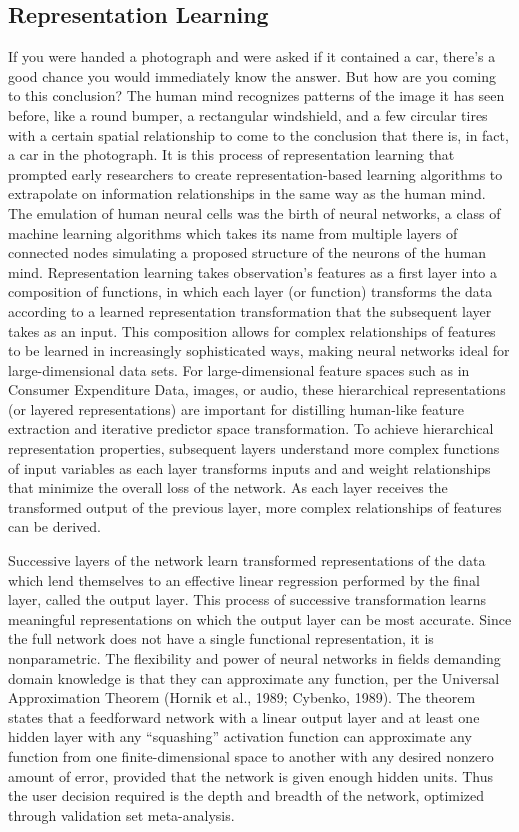 \documentclass[12pt,twoside]{reedthesis}
\begin{document}
\subsection{Representation Learning}\label{representation-learning}

If you were handed a photograph and were asked if it contained a car,
there's a good chance you would immediately know the answer. But how are
you coming to this conclusion? The human mind recognizes patterns of the
image it has seen before, like a round bumper, a rectangular windshield,
and a few circular tires with a certain spatial relationship to come to
the conclusion that there is, in fact, a car in the photograph. It is
this process of representation learning that prompted early researchers
to create representation-based learning algorithms to extrapolate on
information relationships in the same way as the human mind. The
emulation of human neural cells was the birth of neural networks, a
class of machine learning algorithms which takes its name from multiple
layers of connected nodes simulating a proposed structure of the neurons
of the human mind. Representation learning takes observation's features
as a first layer into a composition of functions, in which each layer
(or function) transforms the data according to a learned representation
transformation that the subsequent layer takes as an input. This
composition allows for complex relationships of features to be learned
in increasingly sophisticated ways, making neural networks ideal for
large-dimensional data sets. For large-dimensional feature spaces such
as in Consumer Expenditure Data, images, or audio, these hierarchical
representations (or layered representations) are important for
distilling human-like feature extraction and iterative predictor space
transformation. To achieve hierarchical representation properties,
subsequent layers understand more complex functions of input variables
as each layer transforms inputs and and weight relationships that
minimize the overall loss of the network. As each layer receives the
transformed output of the previous layer, more complex relationships of
features can be derived.

Successive layers of the network learn transformed representations of
the data which lend themselves to an effective linear regression
performed by the final layer, called the output layer. This process of
successive transformation learns meaningful representations on which the
output layer can be most accurate. Since the full network does not have
a single functional representation, it is nonparametric. The flexibility
and power of neural networks in fields demanding domain knowledge is
that they can approximate any function, per the Universal Approximation
Theorem (Hornik et al., 1989; Cybenko, 1989). The theorem states that a
feedforward network with a linear output layer and at least one hidden
layer with any ``squashing'' activation function can approximate any
function from one finite-dimensional space to another with any desired
nonzero amount of error, provided that the network is given enough
hidden units. Thus the user decision required is the depth and breadth
of the network, optimized through validation set meta-analysis.
\end{document}
